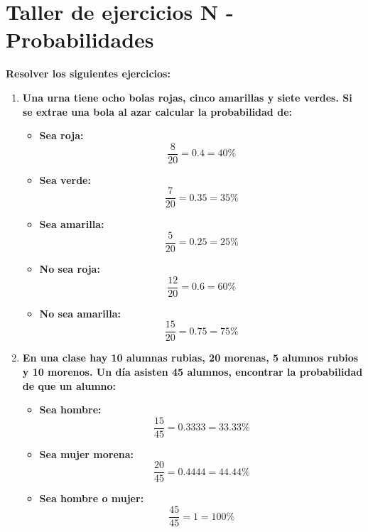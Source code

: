 \documentclass[12pt]{article}
\begin{document}
    

    \section*{\centering  Taller de ejercicios N - Probabilidades} 
    \vspace{0.5cm}\textbf{Resolver los siguientes ejercicios:} \vspace{0.5cm}

    \begin{enumerate}[label=\textbf{\arabic*.}]
        \item \textbf{Una urna tiene ocho bolas rojas, cinco amarillas y siete verdes. Si se extrae una bola al azar calcular la 
                        probabilidad de:}

                        \begin{itemize}
                            \item \textbf{Sea roja:} \[\frac{8}{20} = 0.4 = 40\%\]
                            \item \textbf{Sea verde:} \[\frac{7}{20} = 0.35 = 35\%\]
                            \item \textbf{Sea amarilla:} \[\frac{5}{20} = 0.25 = 25\%\]
                            \item \textbf{No sea roja:} \[\frac{12}{20} = 0.6 = 60\%\]
                            \item \textbf{No sea amarilla:} \[\frac{15}{20} = 0.75 = 75\%\]
                        \end{itemize}

        \item \textbf{En una clase hay 10 alumnas rubias, 20 morenas, 5 alumnos rubios y 10
                        morenos. Un día asisten 45 alumnos, encontrar la probabilidad de que un
                        alumno:}

                        \begin{itemize}
                            \item \textbf{Sea hombre:}  \[\frac{15}{45} = 0.3333 = 33.33\%\]
                            \item \textbf{Sea mujer morena:} \[\frac{20}{45} = 0.4444 = 44.44 \%\]
                            \item \textbf{Sea hombre o mujer:} \[\frac{45}{45} = 1 = 100\%\]
                        \end{itemize}
        

\end{enumerate}
\end{document}
